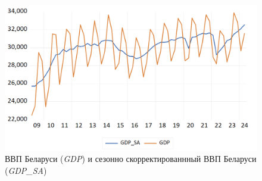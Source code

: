 \documentclass[a4paper, 14pt]{extreport}
\numberwithin{equation}{subsection}
\numberwithin{equation}{section}
\begin{document}
	\begin{figure}[h]
		\centering
		\includegraphics[scale=0.4]{images/img01}
		\caption{ВВП Беларуси (\textit{GDP}) и сезонно скорректированнный ВВП Беларуси (\textit{GDP\_SA})}
		\label{fig:img01}
	\end{figure}
	
\end{document}
